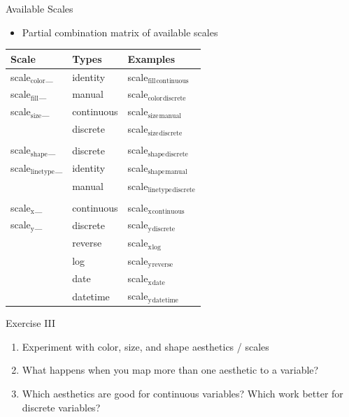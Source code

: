 \documentclass[table,smaller]{beamer}
\begin{document}
\begin{frame}[label=sec-4-9]{Available Scales}
\begin{itemize}
\item Partial combination matrix of available scales
\end{itemize}
\begin{center}
\begin{tabular}{lll}
\alert{Scale} & \alert{Types} & \alert{Examples}\\
\hline
scale$_{\text{color}}$\_ & identity & scale$_{\text{fill}}$$_{\text{continuous}}$\\
scale$_{\text{fill}}$\_ & manual & scale$_{\text{color}}$$_{\text{discrete}}$\\
scale$_{\text{size}}$\_ & continuous & scale$_{\text{size}}$$_{\text{manual}}$\\
 & discrete & scale$_{\text{size}}$$_{\text{discrete}}$\\
 &  & \\
scale$_{\text{shape}}$\_ & discrete & scale$_{\text{shape}}$$_{\text{discrete}}$\\
scale$_{\text{linetype}}$\_ & identity & scale$_{\text{shape}}$$_{\text{manual}}$\\
 & manual & scale$_{\text{linetype}}$$_{\text{discrete}}$\\
 &  & \\
scale$_{\text{x}}$\_ & continuous & scale$_{\text{x}}$$_{\text{continuous}}$\\
scale$_{\text{y}}$\_ & discrete & scale$_{\text{y}}$$_{\text{discrete}}$\\
 & reverse & scale$_{\text{x}}$$_{\text{log}}$\\
 & log & scale$_{\text{y}}$$_{\text{reverse}}$\\
 & date & scale$_{\text{x}}$$_{\text{date}}$\\
 & datetime & scale$_{\text{y}}$$_{\text{datetime}}$\\
\end{tabular}
\end{center}
\end{frame}

\begin{frame}[label=sec-4-10]{Exercise III}
\begin{enumerate}
\item Experiment with color, size, and shape aesthetics / scales
\item What happens when you map more than one aesthetic to a variable?
\item Which aesthetics are good for continuous variables? Which work better for discrete variables?
\end{enumerate}
\end{frame}
\end{document}
